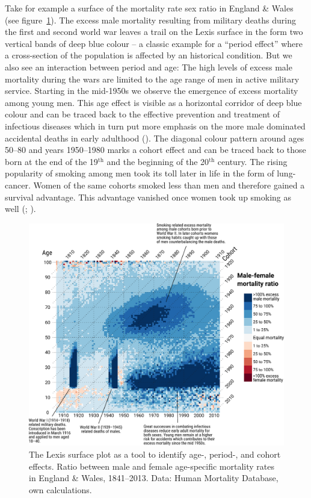 \documentclass[parskip=half]{scrartcl}
\begin{document}
Take for example a surface of the mortality rate sex ratio in England \& Wales (see figure~\ref{fig:lexis_surface}). The excess male mortality resulting from military deaths during the first and second world war leaves a trail on the Lexis surface in the form two vertical bands of deep blue colour -- a classic example for a \enquote{period effect} where a cross-section of the population is affected by an historical condition. But we also see an interaction between period and age: The high levels of excess male mortality during the wars are limited to the age range of men in active military service. Starting in the mid-1950s we observe the emergence of excess mortality among young men. This age effect is visible as a horizontal corridor of deep blue colour and can be traced back to the effective prevention and treatment of infectious diseases which in turn put more emphasis on the more male dominated accidental deaths in early adulthood (\cite{Gjonca2005}). The diagonal colour pattern around ages 50--80 and years 1950--1980 marks a cohort effect and can be traced back to those born at the end of the 19$^\text{th}$ and the beginning of the 20$^\text{th}$ century. The rising popularity of smoking among men took its toll later in life in the form of lung-cancer. Women of the same cohorts smoked less than men and therefore gained a survival advantage. This advantage vanished once women took up smoking as well (\cite{Preston2006}; \cite{Beltran-Sanchez2015}).

\begin{figure}[!htb]
  \centering
  \includegraphics[width = \textwidth]{./fig/lexis_surface.pdf}
  \caption{The Lexis surface plot as a tool to identify age-, period-, and cohort effects. Ratio between male and female age-specific mortality rates in England \& Wales, 1841--2013. Data: Human Mortality Database, own calculations.}
  \label{fig:lexis_surface}
\end{figure}
\end{document}

